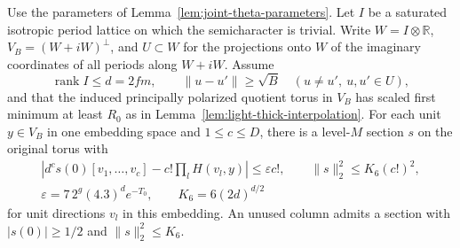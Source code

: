 \begin{auxlemma}
\label{lem:light-thick-lift}
Use the parameters of Lemma~\ref{lem:joint-theta-parameters}.
Let \(I\) be a saturated isotropic period lattice on which the
semicharacter is trivial. Write \(W=I\otimes\mathbb R\),
\(V_B=(W+iW)^\perp\), and \(U\subset W\) for the projections onto
\(W\) of the imaginary coordinates of all periods along \(W+iW\).
Assume
\[
 \operatorname{rank}I\le d=2fm,\qquad
 \|u-u'\|\ge\sqrt B\quad(u\ne u',\ u,u'\in U),
\]
and that the induced
principally polarized quotient torus in \(V_B\) has scaled first
minimum at least \(R_0\) as in Lemma~\ref{lem:light-thick-interpolation}.
For each unit \(y\in V_B\) in one embedding space and
\(1\le c\le D\), there is a level-\(M\) section \(s\) on the original
torus with
\[
 \begin{gathered}
 \left|d^cs(0)[v_1,\ldots,v_c]-c!\prod_lH(v_l,y)\right|
         \le \varepsilon c!,\qquad \|s\|_2^2\le K_6(c!)^2,\\
 \varepsilon=7\,2^g(4.3)^d e^{-T_0},
 \qquad K_6=6(2d)^{d/2}
 \end{gathered}
\]
for unit directions \(v_l\) in this embedding. An unused column admits
a section with \(|s(0)|\ge1/2\) and \(\|s\|_2^2\le K_6\).
\end{auxlemma}

